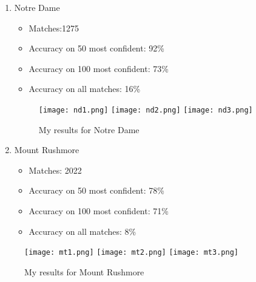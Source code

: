 \begin{enumerate}
    \item Notre Dame
    \begin{itemize}
        \item Matches:1275
        \item Accuracy on 50 most confident: 92\%
        \item Accuracy on 100 most confident: 73\%
        \item Accuracy on all matches: 16\%
    \end{itemize}
    
\begin{figure}[h]
    \centering
    \texttt{[image: nd1.png]}
    \texttt{[image: nd2.png]}
    \texttt{[image: nd3.png]}
    \caption{My results for Notre Dame}
    \label{fig:result1}
\end{figure}
    
    \item Mount Rushmore
    \begin{itemize}
        \item Matches: 2022
        \item Accuracy on 50 most confident: 78\%
        \item Accuracy on 100 most confident: 71\%
        \item Accuracy on all matches: 8\%
    \end{itemize}
\end{enumerate}

\begin{figure}[h]
    \centering
    \texttt{[image: mt1.png]}
    \texttt{[image: mt2.png]}
    \texttt{[image: mt3.png]}
    \caption{My results for Mount Rushmore}
    \label{fig:result1}
\end{figure}


